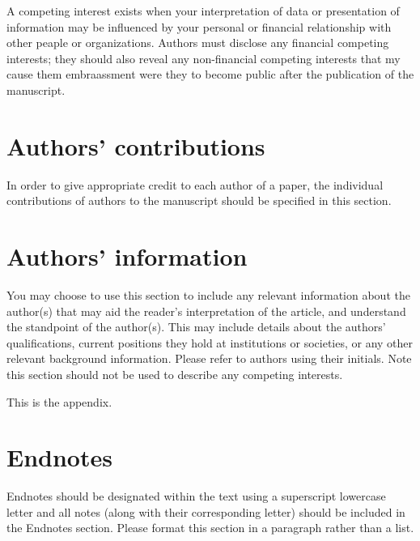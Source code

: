 \documentclass{EPS}
\begin{document}
A competing interest exists when your interpretation of data or
presentation of information may be influenced by your personal or
financial relationship with other peaple or organizations.
Authors must disclose any financial competing interests;
they should also reveal any non-financial competing interests
that my cause them embraassment were they to become public
after the publication of the manuscript.

\section{Authors' contributions}

In order to give appropriate credit to each author of a paper,
the individual contributions of authors to the manuscript
should be specified in this section.

\section{Authors' information}

You may choose to use this section to include any relevant
information about the author(s) that may aid the reader's interpretation
of the article, and understand the standpoint of the author(s).
This may include details about the authors' qualifications,
current positions they hold at institutions or societies,
or any other relevant background information.
Please refer to authors using their initials.
Note this section should not be used
to describe any competing interests.


{This is the appendix.}

\section{Endnotes}

Endnotes should be designated within the text using a
superscript lowercase letter and all notes
(along with their corresponding letter) should be included
in the Endnotes section.
Please format this section in a paragraph rather than a list.
\end{document}

